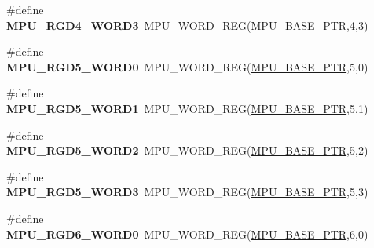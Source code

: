 \begin{DoxyCompactItemize}
\item 
\hypertarget{group___m_p_u___register___accessor___macros_ga79c351ec2317791844d827711e72819d}{}\#define {\bfseries M\+P\+U\+\_\+\+R\+G\+D4\+\_\+\+W\+O\+R\+D3}~M\+P\+U\+\_\+\+W\+O\+R\+D\+\_\+\+R\+E\+G(\hyperlink{group___m_p_u___peripheral_gae2d60f80178d84225d77e5f0214d1f1d}{M\+P\+U\+\_\+\+B\+A\+S\+E\+\_\+\+P\+T\+R},4,3)\label{group___m_p_u___register___accessor___macros_ga79c351ec2317791844d827711e72819d}

\item 
\hypertarget{group___m_p_u___register___accessor___macros_gaf21c93bc82424e971f8ae536b8b2a1ca}{}\#define {\bfseries M\+P\+U\+\_\+\+R\+G\+D5\+\_\+\+W\+O\+R\+D0}~M\+P\+U\+\_\+\+W\+O\+R\+D\+\_\+\+R\+E\+G(\hyperlink{group___m_p_u___peripheral_gae2d60f80178d84225d77e5f0214d1f1d}{M\+P\+U\+\_\+\+B\+A\+S\+E\+\_\+\+P\+T\+R},5,0)\label{group___m_p_u___register___accessor___macros_gaf21c93bc82424e971f8ae536b8b2a1ca}

\item 
\hypertarget{group___m_p_u___register___accessor___macros_ga2860c8fb8b3a4c811b2bf6612a1130e5}{}\#define {\bfseries M\+P\+U\+\_\+\+R\+G\+D5\+\_\+\+W\+O\+R\+D1}~M\+P\+U\+\_\+\+W\+O\+R\+D\+\_\+\+R\+E\+G(\hyperlink{group___m_p_u___peripheral_gae2d60f80178d84225d77e5f0214d1f1d}{M\+P\+U\+\_\+\+B\+A\+S\+E\+\_\+\+P\+T\+R},5,1)\label{group___m_p_u___register___accessor___macros_ga2860c8fb8b3a4c811b2bf6612a1130e5}

\item 
\hypertarget{group___m_p_u___register___accessor___macros_ga2e94a9cf605e1251193b0a3949067fa2}{}\#define {\bfseries M\+P\+U\+\_\+\+R\+G\+D5\+\_\+\+W\+O\+R\+D2}~M\+P\+U\+\_\+\+W\+O\+R\+D\+\_\+\+R\+E\+G(\hyperlink{group___m_p_u___peripheral_gae2d60f80178d84225d77e5f0214d1f1d}{M\+P\+U\+\_\+\+B\+A\+S\+E\+\_\+\+P\+T\+R},5,2)\label{group___m_p_u___register___accessor___macros_ga2e94a9cf605e1251193b0a3949067fa2}

\item 
\hypertarget{group___m_p_u___register___accessor___macros_ga764714e09a465f388c002afeb0103196}{}\#define {\bfseries M\+P\+U\+\_\+\+R\+G\+D5\+\_\+\+W\+O\+R\+D3}~M\+P\+U\+\_\+\+W\+O\+R\+D\+\_\+\+R\+E\+G(\hyperlink{group___m_p_u___peripheral_gae2d60f80178d84225d77e5f0214d1f1d}{M\+P\+U\+\_\+\+B\+A\+S\+E\+\_\+\+P\+T\+R},5,3)\label{group___m_p_u___register___accessor___macros_ga764714e09a465f388c002afeb0103196}

\item 
\hypertarget{group___m_p_u___register___accessor___macros_ga4bd65032a314b6e4f466a5881f3f4b35}{}\#define {\bfseries M\+P\+U\+\_\+\+R\+G\+D6\+\_\+\+W\+O\+R\+D0}~M\+P\+U\+\_\+\+W\+O\+R\+D\+\_\+\+R\+E\+G(\hyperlink{group___m_p_u___peripheral_gae2d60f80178d84225d77e5f0214d1f1d}{M\+P\+U\+\_\+\+B\+A\+S\+E\+\_\+\+P\+T\+R},6,0)\label{group___m_p_u___register___accessor___macros_ga4bd65032a314b6e4f466a5881f3f4b35}


\end{DoxyCompactItemize}

